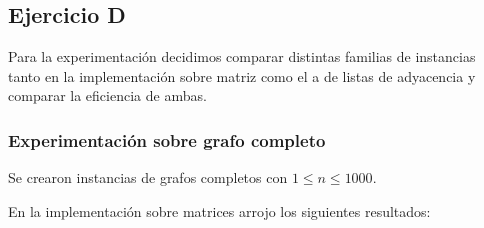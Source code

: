 \subsection{Ejercicio D}

Para la experimentación decidimos comparar distintas familias de instancias tanto en la implementación sobre matriz como el a de listas de adyacencia y comparar la eficiencia de ambas.

\subsubsection{Experimentación sobre grafo completo}

Se crearon instancias de grafos completos con $1 \leq n \leq 1000$.

En la implementación sobre matrices arrojo los siguientes resultados:\\

